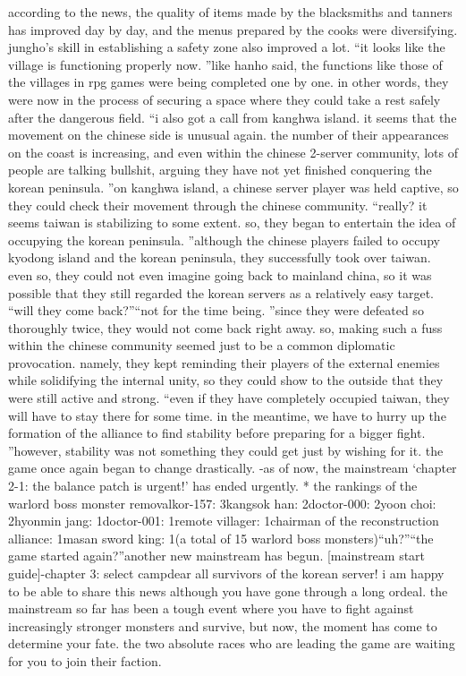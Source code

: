 according to the news, the quality of items made by the blacksmiths and tanners has improved day by day, and the menus prepared by the cooks were diversifying.
 jungho’s skill in establishing a safety zone also improved a lot.
“it looks like the village is functioning properly now.
”like hanho said, the functions like those of the villages in rpg games were being completed one by one.
 in other words, they were now in the process of securing a space where they could take a rest safely after the dangerous field.
“i also got a call from kanghwa island.
 it seems that the movement on the chinese side is unusual again.
 the number of their appearances on the coast is increasing, and even within the chinese 2-server community, lots of people are talking bullshit, arguing they have not yet finished conquering the korean peninsula.
”on kanghwa island, a chinese server player was held captive, so they could check their movement through the chinese community.
“really? it seems taiwan is stabilizing to some extent.
 so, they began to entertain the idea of occupying the korean peninsula.
”although the chinese players failed to occupy kyodong island and the korean peninsula, they successfully took over taiwan.
even so, they could not even imagine going back to mainland china, so it was possible that they still regarded the korean servers as a relatively easy target.
“will they come back?”“not for the time being.
”since they were defeated so thoroughly twice, they would not come back right away.
so, making such a fuss within the chinese community seemed just to be a common diplomatic provocation.
 namely, they kept reminding their players of the external enemies while solidifying the internal unity, so they could show to the outside that they were still active and strong.
“even if they have completely occupied taiwan, they will have to stay there for some time.
 in the meantime, we have to hurry up the formation of the alliance to find stability before preparing for a bigger fight.
”however, stability was not something they could get just by wishing for it.
the game once again began to change drastically.
-as of now, the mainstream ‘chapter 2-1: the balance patch is urgent!’ has ended urgently.
* the rankings of the warlord boss monster removalkor-157: 3kangsok han: 2doctor-000: 2yoon choi: 2hyonmin jang: 1doctor-001: 1remote villager: 1chairman of the reconstruction alliance: 1masan sword king: 1(a total of 15 warlord boss monsters)“uh?”“the game started again?”another new mainstream has begun.
[mainstream start guide]-chapter 3: select campdear all survivors of the korean server! i am happy to be able to share this news although you have gone through a long ordeal.
the mainstream so far has been a tough event where you have to fight against increasingly stronger monsters and survive, but now, the moment has come to determine your fate.
the two absolute races who are leading the game are waiting for you to join their faction.


